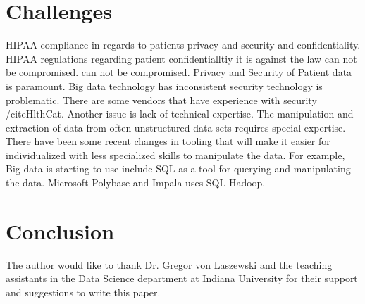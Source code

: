 \documentclass[sigconf]{acmart}
\begin{document}
  

\section{Challenges}
HIPAA compliance in regards to patients privacy and security and confidentiality. HIPAA regulations regarding patient confidentialltiy it is against the law can not be compromised. can not be compromised. Privacy and Security of Patient data is paramount. Big data technology has inconsistent security technology is problematic. There are some vendors that have experience with security /cite{HlthCat}. 
Another issue is lack of technical expertise. The manipulation and extraction of data from often unstructured data sets requires special expertise. There have been some recent changes in tooling that will make it easier for individualized with less specialized skills to manipulate the data. For example,  Big data is starting to use include SQL as a tool for querying and manipulating the data. Microsoft Polybase and Impala uses SQL Hadoop. 
 

\section{Conclusion}








\begin{acks}

  The author would like to thank Dr. Gregor von Laszewski and the teaching assistants in the Data Science department at Indiana University for their support and suggestions to write this paper.

\end{acks}




 
\end{document}
